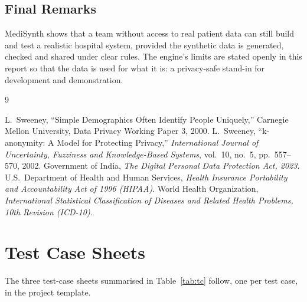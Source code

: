 \documentclass{tietreport}
\begin{document}
\section{Final Remarks}

MediSynth shows that a team without access to real patient data can still
build and test a realistic hospital system, provided the synthetic data is
generated, checked and shared under clear rules. The engine's limits are
stated openly in this report so that the data is used for what it is: a
privacy-safe stand-in for development and demonstration.


\begin{thebibliography}{9}
 L.~Sweeney, ``Simple Demographics Often Identify People
  Uniquely,'' Carnegie Mellon University, Data Privacy Working Paper 3, 2000.
 L.~Sweeney, ``k-anonymity: A Model for Protecting
  Privacy,'' \emph{International Journal of Uncertainty, Fuzziness and
  Knowledge-Based Systems}, vol.~10, no.~5, pp.~557--570, 2002.
 Government of India, \emph{The Digital Personal Data Protection
  Act, 2023}.
 U.S.\ Department of Health and Human Services, \emph{Health
  Insurance Portability and Accountability Act of 1996 (HIPAA)}.
 World Health Organization, \emph{International Statistical
  Classification of Diseases and Related Health Problems, 10th Revision
  (ICD-10)}.
\end{thebibliography}


\appendix
\chapter{Test Case Sheets}
The three test-case sheets summarised in Table~\ref{tab:tc} follow, one per test case, in the project template.


\end{document}
